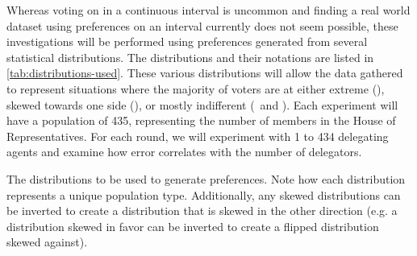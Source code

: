 Whereas voting on in a continuous interval is uncommon and finding a real world dataset
using preferences on an interval currently does not seem possible, these investigations
will be performed using preferences generated from several statistical distributions.
The distributions and their notations are listed in \autoref{tab:distributions-used}.
These various distributions will allow the data gathered to represent situations
where the majority of voters are at either extreme (),
skewed towards one side (), or mostly indifferent
(\gaussiandist\ and ).
Each experiment will have a population of 435, representing the number of members in
the House of Representatives.
For each round, we will experiment with 1 to 434 delegating agents and examine how
error correlates with the number of delegators.

\begin{table}[!htbp]
    \renewcommand{\arraystretch}{1.3}

    \caption{
        The distributions to be used to generate preferences.
        Note how each distribution represents a unique population type.
        Additionally, any skewed distributions can be inverted to create a
        distribution that is skewed in the other direction (e.g. a distribution
        skewed in favor can be inverted to create a flipped distribution skewed
        against).
    }
    \label{tab:distributions-used}

    \centering
    
\end{table}

